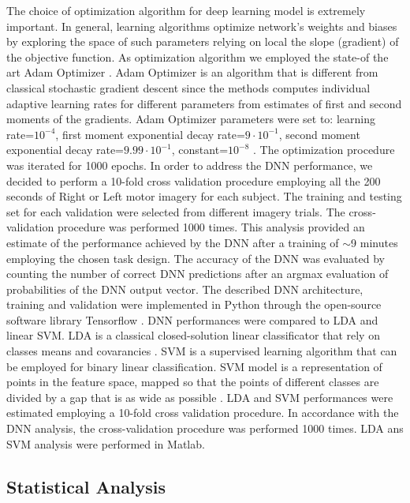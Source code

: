 \documentclass[12pt ]{iopart}
\begin{document}
 The choice of optimization algorithm for deep learning model is extremely important.
 In general,  learning algorithms optimize network's weights and biases by exploring the space of such parameters relying on local the slope (gradient) of the objective function.  
 As optimization algorithm we employed the state-of the art Adam Optimizer \parencite{kingma2014adam}.
Adam Optimizer is an algorithm that is different from classical stochastic gradient descent since the methods computes individual adaptive learning rates for different parameters from estimates of first and second moments of the gradients.
Adam Optimizer parameters were set to: learning rate=$10^{-4}$, first moment exponential decay rate=$9\cdot 10^{-1}$,  second moment exponential decay rate=$9.99\cdot 10^{-1}$, constant=$10^{-8}$ \parencite{kingma2014adam}.
The optimization procedure was iterated for 1000 epochs.
In order to address the DNN performance, we decided to perform a 10-fold cross validation procedure \parencite{kohavi1995study} employing all the 200 seconds of Right or Left motor imagery for each subject. 
The training and testing set for each validation were selected from different imagery trials.
The cross-validation procedure was performed 1000 times. 
This analysis provided an estimate of the performance achieved by the DNN after a training of $\sim$9 minutes employing the chosen task design. 
The accuracy of the DNN was evaluated by counting the number of correct DNN predictions after an argmax evaluation of probabilities of the DNN output vector.
The described DNN architecture, training and validation were implemented in Python  through the open-source software library Tensorflow \parencite{abadi2016tensorflow}.
DNN performances were compared to LDA and linear SVM.
LDA is a classical closed-solution linear classificator that rely on classes means and covarancies \parencite{balakrishnama1998linear}.
SVM is a supervised learning algorithm that can be employed for binary linear classification. SVM model is a representation of  points in the feature space, mapped so that the points of different classes are divided by a gap that is as wide as possible \parencite{cortes1995support}.
LDA and SVM performances were estimated employing  a 10-fold cross validation procedure. In accordance with the DNN analysis,  the cross-validation procedure was performed 1000 times. 
LDA ans SVM analysis were performed in Matlab.

\subsection{Statistical Analysis}
\end{document}
